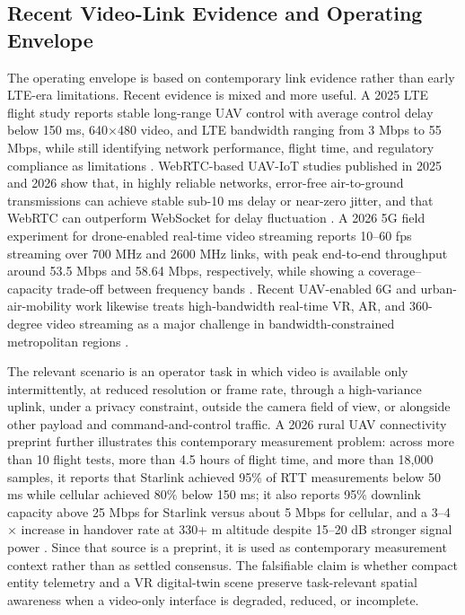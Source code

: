 \documentclass[fleqn]{VRIH2025}
\begin{document}
\subsection{Recent Video-Link Evidence and Operating Envelope}

The operating envelope is based on contemporary link evidence rather than early LTE-era limitations. Recent evidence is mixed and more useful. A 2025 LTE flight study reports stable long-range UAV control with average control delay below 150 ms, 640$\times$480 video, and LTE bandwidth ranging from 3 Mbps to 55 Mbps, while still identifying network performance, flight time, and regulatory compliance as limitations \cite{mohamed2025lteuav}. WebRTC-based UAV-IoT studies published in 2025 and 2026 show that, in highly reliable networks, error-free air-to-ground transmissions can achieve stable sub-10 ms delay or near-zero jitter, and that WebRTC can outperform WebSocket for delay fluctuation \cite{chodorek2025webrtc,chodorek2026webrtc}. A 2026 5G field experiment for drone-enabled real-time video streaming reports 10--60 fps streaming over 700 MHz and 2600 MHz links, with peak end-to-end throughput around 53.5 Mbps and 58.64 Mbps, respectively, while showing a coverage--capacity trade-off between frequency bands \cite{duangsuwan2026uocrf}. Recent UAV-enabled 6G and urban-air-mobility work likewise treats high-bandwidth real-time VR, AR, and 360-degree video streaming as a major challenge in bandwidth-constrained metropolitan regions \cite{chen2025uamstreaming}.

The relevant scenario is an operator task in which video is available only intermittently, at reduced resolution or frame rate, through a high-variance uplink, under a privacy constraint, outside the camera field of view, or alongside other payload and command-and-control traffic. A 2026 rural UAV connectivity preprint further illustrates this contemporary measurement problem: across more than 10 flight tests, more than 4.5 hours of flight time, and more than 18,000 samples, it reports that Starlink achieved 95\% of RTT measurements below 50 ms while cellular achieved 80\% below 150 ms; it also reports 95\% downlink capacity above 25 Mbps for Starlink versus about 5 Mbps for cellular, and a 3--4$\times$ increase in handover rate at 330+ m altitude despite 15--20 dB stronger signal power \cite{chintareddy2026vertical}. Since that source is a preprint, it is used as contemporary measurement context rather than as settled consensus. The falsifiable claim is whether compact entity telemetry and a VR digital-twin scene preserve task-relevant spatial awareness when a video-only interface is degraded, reduced, or incomplete.
\end{document}
